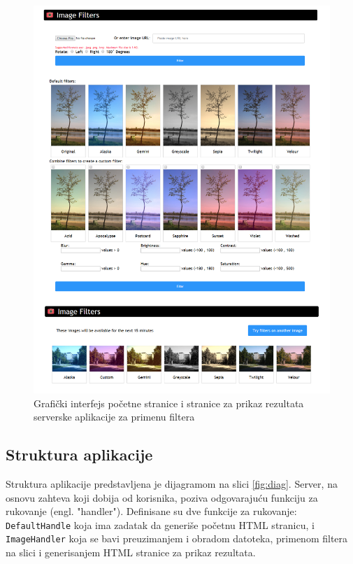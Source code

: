 \documentclass[12pt,oneside]{memoir}
\begin{document}
\begin{figure}
\begin{center}
\includegraphics[scale=1.4]{interface.png}
\end{center}
\caption{Grafički interfejs početne stranice i stranice za prikaz rezultata serverske aplikacije za primenu filtera}
\label{fig:interface}
\end{figure}

\subsection{Struktura aplikacije}
Struktura aplikacije predstavljena je dijagramom na slici \ref{fig:diag}. Server, na osnovu zahteva koji dobija od korisnika, poziva odgovarajuću funkciju za rukovanje (engl. "handler"). Definisane su dve funkcije za rukovanje: \texttt{DefaultHandle} koja ima zadatak da generiše početnu HTML stranicu, i \texttt{ImageHandler} koja se bavi preuzimanjem i obradom datoteka, primenom filtera na slici i generisanjem HTML stranice za prikaz rezultata. 
 
\end{document}

